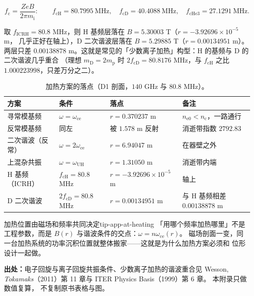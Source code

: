 \begin{equation}
f_\mathrm{c}=\frac{ZeB}{2\pi m_\mathrm{i}}:\qquad
f_\mathrm{cH}=80.7995\ \mathrm{MHz},\quad
f_\mathrm{cD}=40.4088\ \mathrm{MHz},\quad
f_\mathrm{cHe3}=27.1291\ \mathrm{MHz}.
\label{eq:app-at-layers}
\end{equation}

取 $f_\mathrm{ICRH}=80.8$ MHz，则 H 基频层落在 $B=5.30003$ T（$r=-3.92696\times10^{-5}$ m，
几乎正好在轴上），D 二次谐波层落在 $B=5.29885$ T（$r=0.00134951$ m）。两层只差
$0.00138878$ m。这就是常见的「少数离子加热」构型：H 的基频与 D 的二次谐波几乎重合
（理想 $m_\mathrm{D}=2m_\mathrm{p}$ 时 $2f_\mathrm{cD}=80.8176$ MHz，与 $f_\mathrm{cH}$ 之比
$1.000223998$，只差万分之二）。

\begin{table}[htbp]
\centering
\small
\caption{加热方案的落点（D1 剖面，$140$ GHz 与 $80.8$ MHz）。}
\label{tab:app-at-heating}
\begin{tabular}{p{4.4cm}p{3.0cm}p{4.0cm}p{3.4cm}}
\hline
方案 & 条件 & 落点 & 备注 \\
\hline
寻常模基频 & $\omega=\omega_\mathrm{ce}$ & $r=0.370237$ m & $n_\mathrm{e0}<n_\mathrm{c}$，一路通行 \\
反常模基频 & 同左 & 被 $1.578$ m 反射 & 消逝带指数 $2792.83$ \\
二次谐波（反常） & $\omega=2\omega_\mathrm{ce}$ & $r=6.94047$ m & 在器壁之外 \\
上混杂共振 & $\omega=\omega_\mathrm{UH}$ & $r=1.31050$ m & 消逝带内端 \\
H 基频（ICRH） & $f_\mathrm{cH}=80.8$ MHz & $r=-3.92696\times10^{-5}$ m & 轴上 \\
D 二次谐波 & $2f_\mathrm{cD}=80.8$ MHz & $r=0.00134951$ m & 与 H 基频相差 $0.00138878$ m \\
\hline
\end{tabular}
\end{table}

\begin{tip}{加热位置由磁场和频率共同决定}{tip-app-at-heating}
「用哪个频率加热哪里」不是工程参数，而是 $B(r)$ 与谐波条件的交点：$\omega=n\omega_\mathrm{ce}(r)$。
磁场剖面一变，同一台加热系统的功率沉积位置就整体搬家——这就是为什么加热方案必须和
位形设计一起做。
\end{tip}

{\footnotesize
\textbf{出处：}电子回旋与离子回旋共振条件、少数离子加热的谐波重合见 Wesson,
\emph{Tokamaks}（2011）第 11 章与 ITER Physics Basis（1999）第 6 章。
本附录只做数值复算，
不复制原书表格与图。
}

